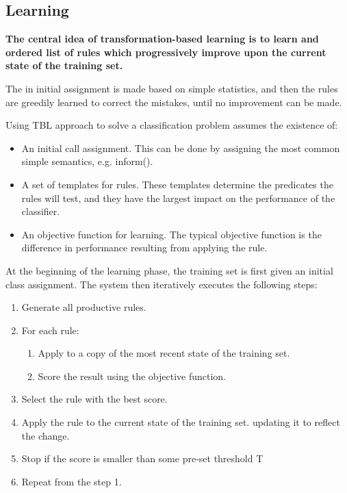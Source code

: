 \documentclass[11pt]{article}
\begin{document}
\subsection{Learning} \label{sec:tbl:learning}
\textbf{The central idea of transformation-based learning is to learn and ordered list of rules which progressively improve upon the current state of the training set.} 

The in initial assignment is made based on simple statistics, and then the rules are greedily learned to correct the mistakes, until no improvement can be made.

Using TBL approach to solve a classification problem assumes the existence of:


\begin{itemize}
  \item An initial call assignment. This can be done by assigning the most common simple semantics, e.g. inform().
  \item A set of templates for rules. These templates determine the predicates the rules will test, and they have the largest impact on the performance of the classifier.
  \item An objective function for learning. The typical objective function is the difference in performance resulting from applying the rule.
\end{itemize}

At the beginning of the learning phase, the training set is first given an initial class assignment. The system then iteratively executes the following steps:

\begin{enumerate}
  \item Generate all productive rules.
  \item For each rule:
  \begin{enumerate}
    \item Apply to a copy of the most recent state of the training set.
    \item Score the result using the objective function.
  \end{enumerate}
  \item Select the rule with the best score.
  \item Apply the rule  to the current state of the training set. updating it to reflect the change.
  \item Stop if the score is smaller than some pre-set threshold T
  \item Repeat from the step 1.
\end{enumerate}
\end{document}
